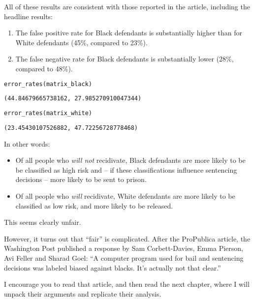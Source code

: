All of these results are consistent with those reported in the article,
including the headline results:

\begin{enumerate}
\def\labelenumi{\arabic{enumi}.}
\item
  The false positive rate for Black defendants is substantially higher
  than for White defendants (45\%, compared to 23\%).
\item
  The false negative rate for Black defendants is substantially lower
  (28\%, compared to 48\%).
\end{enumerate}

\begin{lstlisting}[language=Python,style=source]
error_rates(matrix_black)
\end{lstlisting}

\begin{lstlisting}[style=output]
(44.84679665738162, 27.985270910047344)
\end{lstlisting}

\begin{lstlisting}[language=Python,style=source]
error_rates(matrix_white)
\end{lstlisting}

\begin{lstlisting}[style=output]
(23.45430107526882, 47.72256728778468)
\end{lstlisting}

\pagebreak

In other words:

\begin{itemize}
\item
  Of all people who \emph{will not} recidivate, Black defendants are
  more likely to be be classified as high risk and -- if these
  classifications influence sentencing decisions -- more likely to be
  sent to prison.
\item
  Of all people who \emph{will} recidivate, White defendants are more
  likely to be classified as low risk, and more likely to be released.
\end{itemize}

This seems clearly unfair.

However, it turns out that ``fair'' is complicated. After the ProPublica
article, the Washington Post published a response by Sam Corbett-Davies,
Emma Pierson, Avi Feller and Sharad Goel: ``A computer program used for
bail and sentencing decisions was labeled biased against blacks. It's
actually not that clear.''

I encourage you to read that article, and then read the next chapter,
where I will unpack their arguments and replicate their analysis.
